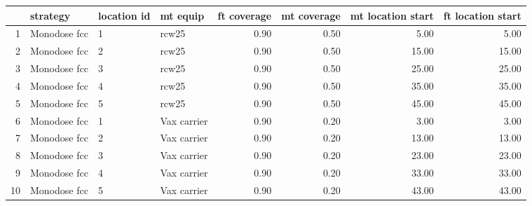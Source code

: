 \documentclass[11pt,a4paper]{article}
\author{James Mba Azam}
\begin{document}
	\begin{landscape}
\begin{tabular}{rlllrrrr}
	\toprule
	& strategy & location id & mt equip & ft coverage & mt coverage & mt location start & ft location start \\ 
	\midrule
	1 & Monodose fcc & 1 & rcw25 & 0.90 & 0.50 & 5.00 & 5.00 \\ 
	2 & Monodose fcc & 2 & rcw25 & 0.90 & 0.50 & 15.00 & 15.00 \\ 
	3 & Monodose fcc & 3 & rcw25 & 0.90 & 0.50 & 25.00 & 25.00 \\ 
	4 & Monodose fcc & 4 & rcw25 & 0.90 & 0.50 & 35.00 & 35.00 \\ 
	5 & Monodose fcc & 5 & rcw25 & 0.90 & 0.50 & 45.00 & 45.00 \\ 
	6 & Monodose fcc & 1 & Vax carrier & 0.90 & 0.20 & 3.00 & 3.00 \\ 
	7 & Monodose fcc & 2 & Vax carrier & 0.90 & 0.20 & 13.00 & 13.00 \\ 
	8 & Monodose fcc & 3 & Vax carrier & 0.90 & 0.20 & 23.00 & 23.00 \\ 
	9 & Monodose fcc & 4 & Vax carrier & 0.90 & 0.20 & 33.00 & 33.00 \\ 
	10 & Monodose fcc & 5 & Vax carrier & 0.90 & 0.20 & 43.00 & 43.00 \\ 
	\bottomrule
\end{tabular}
	\end{landscape}
\end{document}
